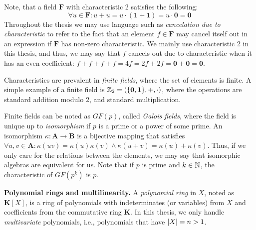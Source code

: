 Note, that a field $\mathbf{F}$ with 
characteristic 2 satisfies the following:
\[
  \forall u \in \mathbf{F} \colon u + u = u \cdot (\mathbf 1 + \mathbf 1) = u \cdot \mathbf 0 = \mathbf 0
\]
Throughout the thesis we may use language such as \emph{cancelation due to characteristic} to 
refer to the fact that an element $f \in \mathbf{F}$ may cancel itself out in an expression if 
$\mathbf{F}$ has non-zero characteristic. 
We mainly use characteristic 2 in this thesis, and thus, we may say that 
$f$ cancels out due to characteristic when 
it has an even coefficient: 
$f + f + f + f = 4f = 2f + 2f = \mathbf{0} + \mathbf{0} = \mathbf{0}.$

Characteristics are prevalent in \emph{finite fields}, where the set of elements is finite. 
A simple example of a finite field is $\mathbb Z_2 = (\{\mathbf{0}, \mathbf{1}\}, +, \cdot)$, where 
the operations are standard addition modulo 2, and standard multiplication. 

Finite fields can be noted as $GF(p)$, called \emph{Galois fields}, where the field is unique 
up to \emph{isomorphism} if $p$ is a prime or a power of some prime. 
An isomorphism $\kappa \colon \mathbf{A} \to \mathbf{B}$ 
is a bijective mapping that satisfies 
$\forall u,v \in \mathbf{A} \colon \kappa(uv) = \kappa(u)\kappa(v) \wedge \kappa(u+v) = \kappa(u)+\kappa(v).$ 
Thus, if we only care for the relations between the elements, we may say that isomorphic algebras are 
equivalent for us. 
Note that if $p$ is prime and $k \in \mathbb N$, the characteristic of $GF(p^k)$ is $p$. 

\textbf{Polynomial rings and multilinearity.} 
A \emph{polynomial ring} in $X$, noted as $\mathbf{K}[X]$,
is a ring of polynomials with indeterminates (or variables) from $X$ and 
coefficients from the commutative ring $\mathbf{K}$. 
In this thesis, we only handle \emph{multivariate} 
polynomials, i.e., polynomials that have ${\left\vert X\right\vert} = n > 1$. 

